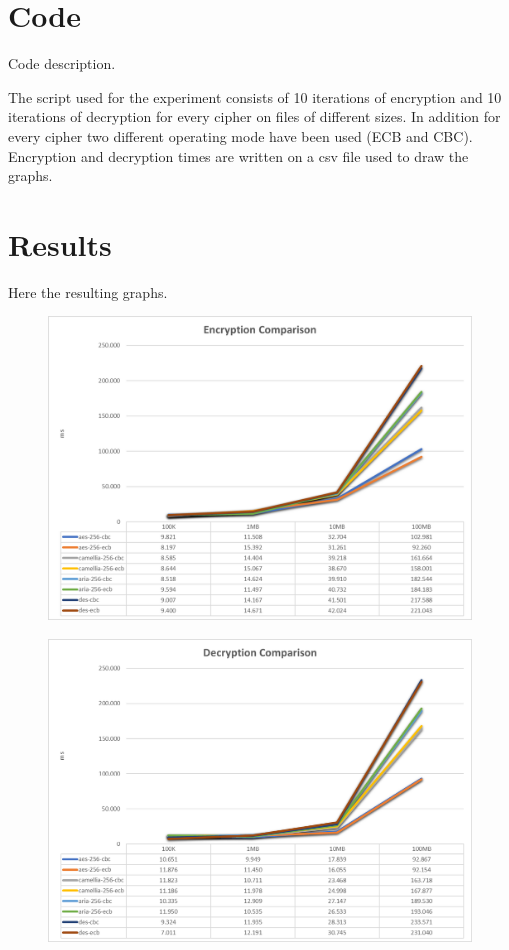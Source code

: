 \documentclass[11pt,a4paper]{article}
\begin{document}
\section{Code}
Code description.

The script used for the experiment consists of 10 iterations of encryption and 10 iterations of decryption for every cipher on files of different sizes. In addition for every cipher two different operating mode have been used (ECB and CBC).
Encryption and decryption times are written on a csv file used to draw the graphs.

\clearpage
\section{Results}
Here the resulting graphs.

\begin{figure}[H]
    \centering
        \includegraphics[width=\textwidth]{enc-hw1-1649359.jpg}
\end{figure}
\begin{figure}[h]
    \centering
        \includegraphics[width=\textwidth]{dec-hw1-1649359.jpg}
\end{figure}
\end{document}
